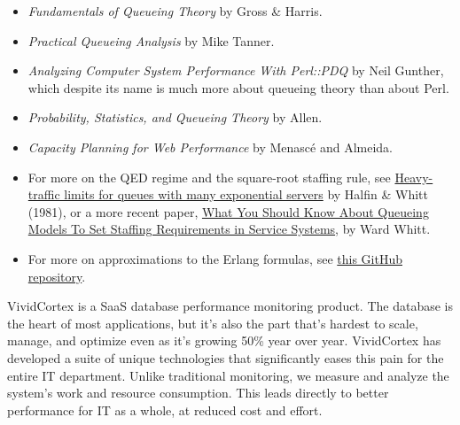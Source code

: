 \documentclass{vivid_layout}
\begin{document}
\begin{itemize}
\item {\itshape Fundamentals of Queueing Theory} by Gross \& Harris.
\item {\itshape Practical Queueing Analysis} by Mike Tanner.
\item {\itshape Analyzing Computer System Performance With Perl::PDQ} by Neil
Gunther, which despite its name is much more about queueing theory than about
Perl.
\item {\itshape Probability, Statistics, and Queueing Theory} by Allen.
\item {\itshape Capacity Planning for Web Performance} by Menasc\'e and Almeida.
\item For more on the QED regime and the square-root staffing rule, see
\href{http://www.columbia.edu/~ww2040/HalfinWW1981.pdf}{Heavy-traffic limits for queues with many exponential servers} by Halfin \& Whitt (1981), or a more recent paper, \href{http://www.columbia.edu/~ww2040/shorter041907.pdf}{What You Should Know About Queueing Models To Set Staffing Requirements in Service Systems}, by Ward Whitt.
\item For more on approximations to the Erlang formulas, see
\href{https://github.com/VividCortex/approx-queueing-theory}{this GitHub
repository}.
\end{itemize}

\newpage

\begin{about}	%
VividCortex is a SaaS database performance monitoring product. The database is the heart of most applications, but it's also the part that's hardest to scale, manage, and optimize even as it's growing 50\% year over year. VividCortex has developed a suite of unique technologies that significantly eases this pain for the entire IT department. Unlike traditional monitoring, we measure
and analyze the system's work and resource consumption. This leads directly to better performance for IT as a whole, at reduced cost and effort.
\end{about}
\makeresources	%
\end{document}
